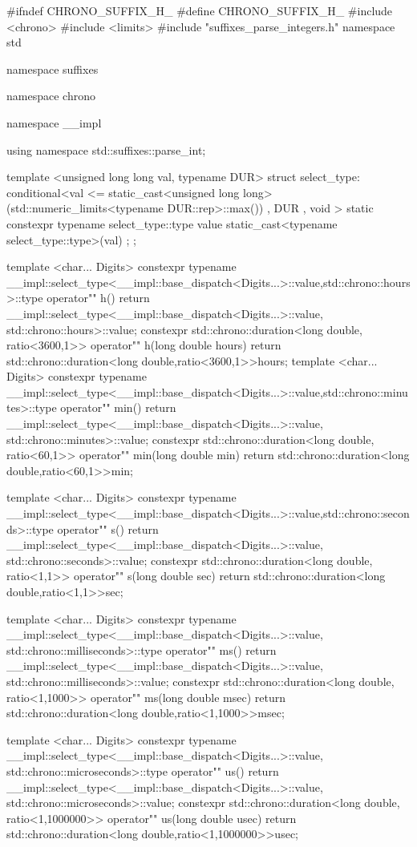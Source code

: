\documentclass[ebook,11pt,article]{memoir}
\begin{document}
\begin{codeblock}
#ifndef CHRONO_SUFFIX_H_
#define CHRONO_SUFFIX_H_
#include <chrono>
#include <limits>
#include "suffixes_parse_integers.h"
namespace std {
namespace suffixes {
namespace chrono {

namespace __impl {
using namespace std::suffixes::parse_int;

template <unsigned long long val, typename DUR>
struct select_type:
    conditional<val <=
      static_cast<unsigned long long>(std::numeric_limits<typename DUR::rep>::max())
    , DUR
    , void > {
        static constexpr typename select_type::type
            value{ static_cast<typename select_type::type>(val) };
    };
}

template <char... Digits>
constexpr typename 
__impl::select_type<__impl::base_dispatch<Digits...>::value,std::chrono::hours>::type
operator"" h(){
    return  __impl::select_type<__impl::base_dispatch<Digits...>::value,
                std::chrono::hours>::value;
}
constexpr std::chrono::duration<long double, ratio<3600,1>> operator"" h(long double hours){
    return std::chrono::duration<long double,ratio<3600,1>>{hours};
}
template <char... Digits>
constexpr typename 
__impl::select_type<__impl::base_dispatch<Digits...>::value,std::chrono::minutes>::type
operator"" min(){
    return __impl::select_type<__impl::base_dispatch<Digits...>::value,
               std::chrono::minutes>::value;
}
constexpr std::chrono::duration<long double, ratio<60,1>> operator"" min(long double min){
    return std::chrono::duration<long double,ratio<60,1>>{min};
}

template <char... Digits>
constexpr typename 
__impl::select_type<__impl::base_dispatch<Digits...>::value,std::chrono::seconds>::type
operator"" s(){
    return __impl::select_type<__impl::base_dispatch<Digits...>::value,
               std::chrono::seconds>::value;
}
constexpr std::chrono::duration<long double, ratio<1,1>> operator"" s(long double sec){
    return std::chrono::duration<long double,ratio<1,1>>{sec};
}

template <char... Digits>
constexpr typename 
__impl::select_type<__impl::base_dispatch<Digits...>::value,
std::chrono::milliseconds>::type
operator"" ms(){
    return __impl::select_type<__impl::base_dispatch<Digits...>::value,
               std::chrono::milliseconds>::value;
}
constexpr std::chrono::duration<long double, ratio<1,1000>> 
operator"" ms(long double msec){
    return std::chrono::duration<long double,ratio<1,1000>>{msec};
}

template <char... Digits>
constexpr typename 
__impl::select_type<__impl::base_dispatch<Digits...>::value,
std::chrono::microseconds>::type
operator"" us(){
    return __impl::select_type<__impl::base_dispatch<Digits...>::value,
               std::chrono::microseconds>::value;
}
constexpr std::chrono::duration<long double, ratio<1,1000000>> 
operator"" us(long double usec){
    return std::chrono::duration<long double,ratio<1,1000000>>{usec};
}

}}}
\end{codeblock}
\end{document}
